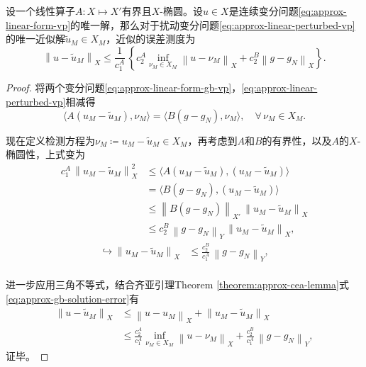 \begin{theorem}[斯特朗第一引理]
  设一个线性算子$A:X \mapsto X'$有界且$X$-椭圆。设$u \in X$是连续变分问题\eqref{eq:approx-linear-form-vp}的唯一解，那么对于扰动变分问题\eqref{eq:approx-linear-perturbed-vp}的唯一近似解$\tilde{u}_{M} \in X_{M}$，近似的误差测度为
  \begin{equation}
    \label{eq:approx-linear-approx-error-estimate}
    \left\| u - \tilde{u}_{M} \right\|_{X}
    \le \frac{1}{c_{1}^{A}} \,
    \left\{
    c_{2}^{A} \inf_{\nu_{M} \in X_{M}} \left\| u - \nu_{M} \right\|_{X}
    + c_{2}^{B} \left\| g - g_{N} \right\|_{X}
    \right\}.
  \end{equation}
\end{theorem}
\begin{proof}
  将两个变分问题\eqref{eq:approx-linear-form-gb-vp}，\eqref{eq:approx-linear-perturbed-vp}相减得
  \begin{equation*}
    \langle A \left( u_{M} - \tilde{u}_{M} \right), \nu_{M} \rangle
    = \langle B \left( g - g_{N} \right), \nu_{M} \rangle, \quad \forall \, \nu_{M} \in X_{M}.
  \end{equation*}

  现在定义检测方程为$\nu_{M} \coloneqq u_{M} - \tilde{u}_{M} \in X_{M}$，再考虑到$A$和$B$的有界性，以及$A$的$X$-椭圆性，上式变为
  \begin{equation*}
    \begin{split}
    c_{1}^{A} \, \left\| u_{M} - \tilde{u}_{M} \right\|_{X}^{2} & \le \langle A \left( u_{M} - \tilde{u}_{M} \right), \left( u_{M} - \tilde{u}_{M} \right) \rangle \\
    & = \langle B \left( g - g_{N} \right), \left( u_{M} - \tilde{u}_{M} \right) \rangle \\
    & \le \left\|
    B \left( g - g_{N} \right) \right\|_{X'}
    \, \left\| u_{M} - \tilde{u}_{M} \right\|_{X} \\
    & \le c_{2}^{B} \, \left\|
    g - g_{N} \right\|_{Y}
    \, \left\| u_{M} - \tilde{u}_{M} \right\|_{X},
  \end{split}
\end{equation*}
\begin{equation*}
  \begin{split}
  \hookrightarrow \left\| u_{M} - \tilde{u}_{M} \right\|_{X}
  & \le \frac{c_{2}^{B}}{c_{1}^{A}} \, \left\| g - g_{N} \right\|_{Y}, \\
  \end{split}
\end{equation*}

进一步应用三角不等式，结合齐亚引理Theorem \ref{theorem:approx-cea-lemma}式\eqref{eq:approx-gb-solution-error}有
\begin{equation*}
  \begin{split}
    \left\| u - \tilde{u}_{M} \right\|_{X}
    & \le \left\| u - u_{M} \right\|_{X} + \left\| u_{M} - \tilde{u}_{M} \right\|_{X} \\
    & \le \frac{c_{2}^{A}}{c_{1}^{A}} \inf_{\nu_{M} \in X_{M}} \left\| u - \nu_{M} \right\|_{X} + \frac{c_{2}^{B}}{c_{1}^{A}} \, \left\| g - g_{N} \right\|_{Y},
  \end{split}
\end{equation*}
证毕。
\end{proof}


